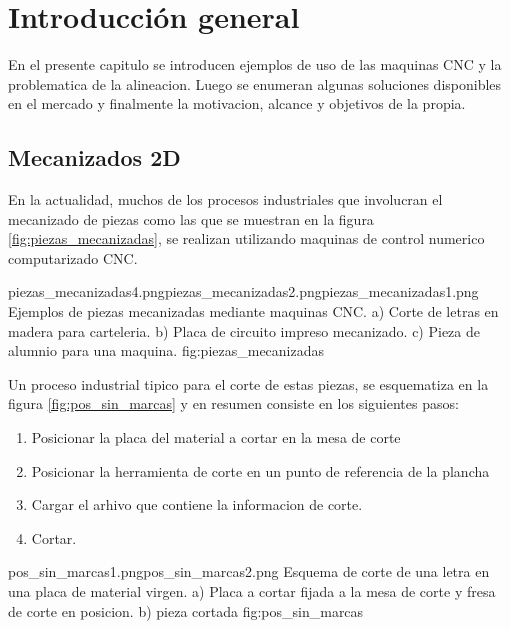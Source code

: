 
\chapter{Introducción general} %

En el presente capitulo se introducen ejemplos de uso de las maquinas CNC y la problematica de la alineacion. Luego se enumeran algunas soluciones disponibles en el mercado y finalmente la motivacion, alcance y objetivos de la propia.

\label{Chapter1} %
\label{IntroGeneral}




\section{Mecanizados 2D}
En la actualidad, muchos de los procesos industriales que involucran el mecanizado de piezas como las que se muestran en la figura \ref{fig:piezas_mecanizadas}, se realizan utilizando maquinas de control numerico computarizado CNC.

            {piezas_mecanizadas4.png}{piezas_mecanizadas2.png}{piezas_mecanizadas1.png}
            {Ejemplos de piezas mecanizadas mediante maquinas CNC. a) Corte de letras en madera para carteleria. b) Placa de circuito impreso mecanizado. c) Pieza de alumnio para una maquina. }
            {fig:piezas_mecanizadas}

            Un proceso industrial tipico para el corte de estas piezas, se esquematiza en la figura \ref{fig:pos_sin_marcas} y en resumen consiste en los siguientes pasos:

\begin{enumerate}
\item{Posicionar la placa del material a cortar en la mesa de corte}
\item{Posicionar la herramienta de corte en un punto de referencia de la plancha}
\item{Cargar el arhivo que contiene la informacion de corte.}
\item{Cortar.}
\end{enumerate}

         {pos_sin_marcas1.png}{pos_sin_marcas2.png}
         {Esquema de corte de una letra en una placa de material virgen. a) Placa a cortar fijada a la mesa de corte y fresa de corte en posicion. b) pieza cortada}
         {fig:pos_sin_marcas}

